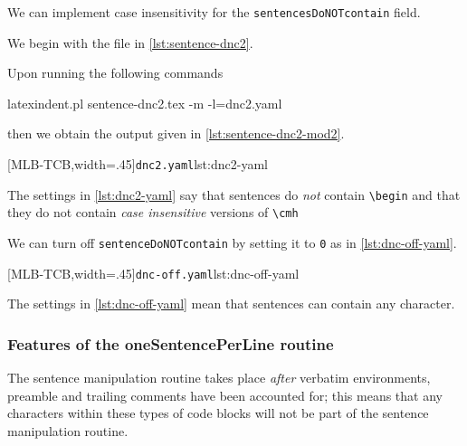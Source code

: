 \documentclass[10pt]{article}
\begin{document}
 \begin{example}
 We can implement case insensitivity for the \texttt{sentencesDoNOTcontain} field.

 We begin with the file in \cref{lst:sentence-dnc2}.


 Upon running the following commands

 \begin{commandshell}
latexindent.pl sentence-dnc2.tex -m -l=dnc2.yaml
\end{commandshell}

 then we obtain the output given in \cref{lst:sentence-dnc2-mod2}.

 \begin{cmhtcbraster}[ raster left skip=-2.5cm,
   raster right skip=-1cm,
   raster force size=false,
   raster column 1/.style={add to width=3cm},
  ]
  [MLB-TCB,width=.45\textwidth]{\texttt{dnc2.yaml}}{lst:dnc2-yaml}
 \end{cmhtcbraster}

 The settings in \cref{lst:dnc2-yaml} say that sentences do \emph{not} contain
 \lstinline!\begin! and that they do not contain \emph{case insensitive} versions of
 \lstinline!\cmh!
 \end{example}
 \begin{example}
 We can turn off \texttt{sentenceDoNOTcontain} by setting it to \texttt{0} as in
 \cref{lst:dnc-off-yaml}.

 [MLB-TCB,width=.45\textwidth]{\texttt{dnc-off.yaml}}{lst:dnc-off-yaml}

 The settings in \cref{lst:dnc-off-yaml} mean that sentences can contain any character.
 \end{example}

\subsubsection{Features of the oneSentencePerLine routine}
 The sentence manipulation routine takes place \emph{after} verbatim  environments, preamble and trailing comments have been
 accounted for; this means that any characters within these types of code blocks will not
 be part of the sentence manipulation routine.
\end{document}

